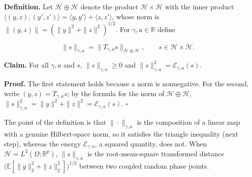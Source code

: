 \documentclass[11pt,a4paper]{article}
\begin{document}
\textbf{Definition.} Let \(\mathcal H\oplus \mathcal H\) denote the product \(\mathcal H\times \mathcal H\) with the inner product \(\langle(y,z),(y',z')\rangle=\langle y,y'\rangle+\langle z,z'\rangle\), whose norm is \(\|(y,z)\|=(\|y\|^2+\|z\|^2)^{1/2}\). For \(\gamma,a\in\mathbb R\) define


\[\|s\|_{\gamma,a}=\bigl\|T_{\gamma,a}s\bigr\|_{\mathcal H\oplus \mathcal H},\qquad s\in \mathcal H\times \mathcal H.\]


\textbf{Claim.} For all \(\gamma,a\) and \(s\), \(\|s\|_{\gamma,a}\ge0\) and \(\|s\|_{\gamma,a}^2=\mathcal E_{\gamma,a}(s)\).




\textbf{Proof.} The first statement holds because a norm is nonnegative. For the second, write \((y,z)=T_{\gamma,a}s\); by the formula for the norm of \(\mathcal H\oplus \mathcal H\), \(\|s\|_{\gamma,a}^2=\|y\|^2+\|z\|^2=\mathcal E_{\gamma,a}(s)\). \(\square\)




The point of the definition is that \(\|\cdot\|_{\gamma,a}\) is the composition of a linear map with a genuine Hilbert-space norm, so it satisfies the triangle inequality (next step), whereas the energy \(\mathcal E_{\gamma,a}\), a squared quantity, does not. When \(\mathcal H=L^2(\Omega;\mathbb R^p)\), \(\|s\|_{\gamma,a}\) is the root-mean-square transformed distance \(\bigl(\mathbb E[\|y\|_2^2+\|z\|_2^2]\bigr)^{1/2}\) between two coupled random phase points.
\end{document}

